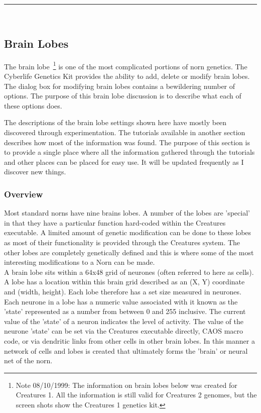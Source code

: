 \documentclass[11pt,twoside,a4paper]{article}
\begin{document}
\rule{10cm}{0.5mm}~\\


\subsection{Brain Lobes} %

The brain lobe~\footnote{Note 08/10/1999: The information on brain lobes below was created for Creatures 1. All the information is still valid for Creatures 2 genomes, but the screen shots show the Creatures 1 genetics kit.} is one of the most complicated portions of norn genetics. The Cyberlife Genetics Kit provides the ability to add, delete or modify brain lobes. The dialog box for modifying brain lobes contains a bewildering number of options. The purpose of this brain lobe discussion is to describe what each of these options does.~\\

\clearpage

The descriptions of the brain lobe settings shown here have mostly been discovered through experimentation. The tutorials available in another section  describes how most of the information was found. The purpose of this section is to provide a single place where all the information gathered through the tutorials and other places can be placed for easy use. It will be updated frequently as I discover new things.

\subsubsection{Overview}

Most standard norns have nine brains lobes. A number of the lobes are 'special' in that they have a particular function hard-coded within the Creatures executable. A limited amount of genetic modification can be done to these lobes as most of their functionality is provided through the Creatures system. The other lobes are completely genetically defined and this is where some of the most interesting modifications to a Norn can be made.~\\

A brain lobe sits within a 64x48 grid of neurones (often referred to here as cells). A lobe has a location within this brain grid described as an (X, Y) coordinate and (width, height). Each lobe therefore has a set size measured in neurones. Each neurone in a lobe has a numeric value associated with it known as the 'state' represented as a number from between 0 and 255 inclusive. The current value of the 'state' of a neuron indicates the level of activity. The value of the neurone 'state' can be set via the Creatures executable directly, CAOS macro code, or via dendritic links from other cells in other brain lobes. In this manner a network of cells and lobes is created that ultimately forms the 'brain' or neural net of the norn.~\\
\end{document}
